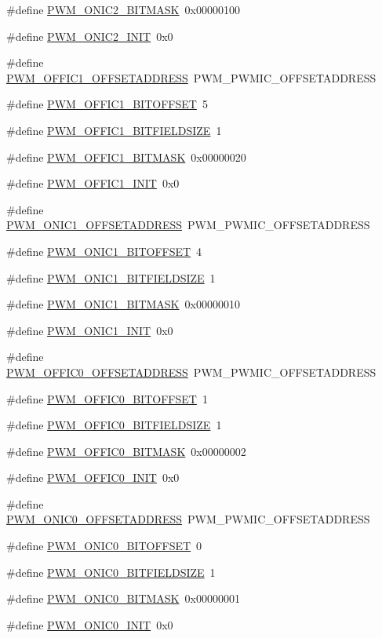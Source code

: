 \begin{DoxyCompactItemize}
\item 
\#define \hyperlink{a00565_acc0b23fde7b18f435bdb338004f94edf}{PWM\_\-ONIC2\_\-BITMASK}~0x00000100
\item 
\#define \hyperlink{a00565_aaea40cf71b9841eaca0de14a491e1f60}{PWM\_\-ONIC2\_\-INIT}~0x0
\item 
\#define \hyperlink{a00565_a688d14f7269cbf615626d282e6723295}{PWM\_\-OFFIC1\_\-OFFSETADDRESS}~PWM\_\-PWMIC\_\-OFFSETADDRESS
\item 
\#define \hyperlink{a00565_a25bb383aa09d4f5b7c9a2bf36749de18}{PWM\_\-OFFIC1\_\-BITOFFSET}~5
\item 
\#define \hyperlink{a00565_a389bbb6e06ce4364b917a97c7cf8c7e1}{PWM\_\-OFFIC1\_\-BITFIELDSIZE}~1
\item 
\#define \hyperlink{a00565_a51c063c90cab4885e923fbfe8ca2df66}{PWM\_\-OFFIC1\_\-BITMASK}~0x00000020
\item 
\#define \hyperlink{a00565_a741fd8a2002de1bbedde6b605b932db3}{PWM\_\-OFFIC1\_\-INIT}~0x0
\item 
\#define \hyperlink{a00565_a8720f560d7ebf143f6f0838a708c2745}{PWM\_\-ONIC1\_\-OFFSETADDRESS}~PWM\_\-PWMIC\_\-OFFSETADDRESS
\item 
\#define \hyperlink{a00565_a70925ca11d17d6032e0d2a5cb3c64343}{PWM\_\-ONIC1\_\-BITOFFSET}~4
\item 
\#define \hyperlink{a00565_a6406cc11fa48cff5633713551ecad887}{PWM\_\-ONIC1\_\-BITFIELDSIZE}~1
\item 
\#define \hyperlink{a00565_aee5abeb79015964b2c60680245350820}{PWM\_\-ONIC1\_\-BITMASK}~0x00000010
\item 
\#define \hyperlink{a00565_a72905a56a3e9112c596eb93288adc8ec}{PWM\_\-ONIC1\_\-INIT}~0x0
\item 
\#define \hyperlink{a00565_a86d4d70c23c0eda27e2b2f3fdafd9fe5}{PWM\_\-OFFIC0\_\-OFFSETADDRESS}~PWM\_\-PWMIC\_\-OFFSETADDRESS
\item 
\#define \hyperlink{a00565_a558b49b89b6c5d1601fe3906a07a62c4}{PWM\_\-OFFIC0\_\-BITOFFSET}~1
\item 
\#define \hyperlink{a00565_aed02228d5918701750e7268012c37063}{PWM\_\-OFFIC0\_\-BITFIELDSIZE}~1
\item 
\#define \hyperlink{a00565_a80e891db0c3f2402d67feb80cc462e44}{PWM\_\-OFFIC0\_\-BITMASK}~0x00000002
\item 
\#define \hyperlink{a00565_ab445c0b98ac492ac0e23ed74252c3b62}{PWM\_\-OFFIC0\_\-INIT}~0x0
\item 
\#define \hyperlink{a00565_afc5297678ec187528a5d97caf97284c1}{PWM\_\-ONIC0\_\-OFFSETADDRESS}~PWM\_\-PWMIC\_\-OFFSETADDRESS
\item 
\#define \hyperlink{a00565_a928d555584e421cb9e6e88567673806d}{PWM\_\-ONIC0\_\-BITOFFSET}~0
\item 
\#define \hyperlink{a00565_a465874ab844956b4c3fb9a19d9e1acdd}{PWM\_\-ONIC0\_\-BITFIELDSIZE}~1
\item 
\#define \hyperlink{a00565_aac0c63571edc91f2d9934facb0b2c0ee}{PWM\_\-ONIC0\_\-BITMASK}~0x00000001
\item 
\#define \hyperlink{a00565_a6cd4e0b036ef62f52d2d5f102572c526}{PWM\_\-ONIC0\_\-INIT}~0x0
\end{DoxyCompactItemize}


